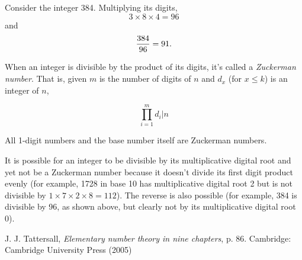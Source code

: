 \documentclass[12pt]{article}
\begin{document}
Consider the integer 384. Multiplying its digits, $$3 \times 8 \times 4 = 96$$ and $${{384} \over {96}} = 91.$$

When an integer is divisible by the product of its digits, it's called a {\em Zuckerman number}. That is, given $m$ is the number of digits of $n$ and $d_x$ (for $x \le k$) is an integer of $n$,

$${\prod_{i = 1}^m d_i}|n$$

All 1-digit numbers and the base number itself are Zuckerman numbers.

It is possible for an integer to be divisible by its multiplicative digital root and yet not be a Zuckerman number because it doesn't divide its first digit product evenly (for example, 1728 in base 10 has multiplicative digital root 2 but is not divisible by $1 \times 7 \times 2 \times 8 = 112$). The reverse is also possible (for example, 384 is divisible by 96, as shown above, but clearly not by its multiplicative digital root 0).

\begin{thebibliography}{2}
 J. J. Tattersall, {\it Elementary number theory in nine chapters}, p. 86. Cambridge: Cambridge University Press (2005)
\end{thebibliography}

\end{document}
